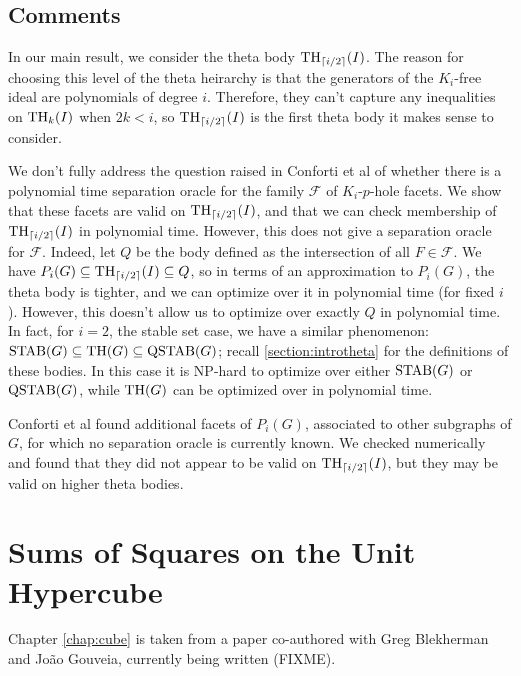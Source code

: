 \subsection{Comments}
In our main result, we consider the theta body $\textup{TH}_{\lceil i/2 \rceil}(I)$. 
The reason for choosing this level of the theta heirarchy is that the generators of the $K_i$-free ideal are polynomials of degree $i$.
Therefore, they can't capture any inequalities on $\textup{TH}_k(I)$ when $2k < i$, so $\textup{TH}_{\lceil i/2 \rceil}(I)$ is the first theta body it makes sense to consider.

We don't fully address the question raised in Conforti et al \cite{conforti} of whether there is a polynomial time separation oracle for the family $\mathcal{F}$ of $K_i$-$p$-hole facets.
We show that these facets are valid on $\textup{TH}_{\lceil i/2\rceil}(I)$, and that we can check membership of $\textup{TH}_{\lceil i/2 \rceil}(I)$ in polynomial time. 
However, this does not give a separation oracle for $\mathcal{F}$.
Indeed, let $Q$ be the body defined as the intersection of all $F \in \mathcal{F}$.
We have $P_i(G) \subseteq \textup{TH}_{\lceil i/2\rceil}(I) \subseteq Q$, so in terms of an approximation to $P_i(G)$, the theta body is tighter, and we can optimize over it in polynomial time (for fixed $i$).
However, this doesn't allow us to optimize over exactly $Q$ in polynomial time.
In fact, for $i=2$, the stable set case, we have a similar phenomenon: $\textup{STAB}(G) \subseteq \textup{TH}(G) \subseteq \textup{QSTAB}(G)$; recall \ref{section:introtheta} for the definitions of these bodies.
In this case it is NP-hard to optimize over either $\textup{STAB}(G)$ or $\textup{QSTAB}(G)$, while $\textup{TH}(G)$ can be optimized over in polynomial time.


Conforti et al \cite{conforti} found additional facets of $P_i(G)$, associated to other subgraphs of $G$, for which no separation oracle is currently known. 
We checked numerically and found that they did not appear to be valid on $\textup{TH}_{\lceil i/2\rceil}(I)$, but they may be valid on higher theta bodies.

\section{Sums of Squares on the Unit Hypercube}
Chapter \ref{chap:cube} is taken from a paper co-authored with Greg Blekherman and Jo\~ao Gouveia, currently being written (FIXME).

